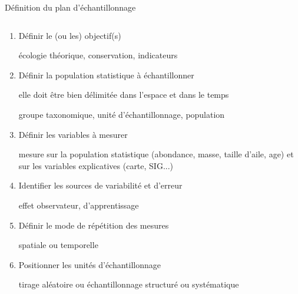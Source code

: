\documentclass[10pt]{beamer}
\begin{document}
\begin{frame}{Définition du plan d'échantillonnage}
  \begin{columns}[c]
    \begin{column}[c]{0.7\textwidth}
      \begin{small}
        \begin{enumerate}[<+->]
        \item Définir le (ou les) objectif(s) \\
           {
            \begin{footnotesize}
              écologie théorique, conservation, indicateurs
            \end{footnotesize}}
        \item Définir la population statistique à échantillonner\\
           {
            elle doit être bien délimitée dans l’espace et dans le temps \\
            \begin{footnotesize}
              groupe taxonomique, unité d'échantillonnage, population
            \end{footnotesize}}
        \item Définir les variables à mesurer\\
           {
            \begin{footnotesize}
              mesure sur la population statistique (abondance, masse, taille
              d'aile, age) et sur les variables
              explicatives (carte, SIG...)
            \end{footnotesize}}
        \item Identifier les sources de variabilité et d'erreur\\
           {
            \begin{footnotesize}
              effet observateur, d'apprentissage
            \end{footnotesize}}
        \item Définir le mode de répétition des mesures\\
           {
            \begin{footnotesize}
              spatiale ou temporelle
            \end{footnotesize}}
        \item Positionner les unités d'échantillonnage 
           {
            \begin{footnotesize}
              tirage aléatoire ou échantillonnage structuré ou systématique

\end{footnotesize}}
\end{enumerate}
\end{small}
\end{column}
\end{columns}
\end{frame}
\end{document}

